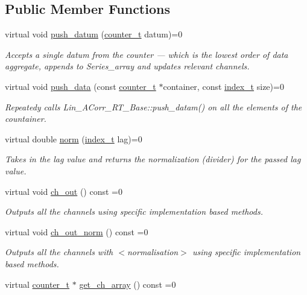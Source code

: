 \subsection*{Public Member Functions}
\begin{DoxyCompactItemize}
\item 
virtual void \hyperlink{classLin__ACorr__RT__Base_a398167525faf2a65f29722e943a0c57e}{push\+\_\+datum} (\hyperlink{types_8hpp_ac89ac912f524b3e3fa3720ea55fec966}{counter\+\_\+t} datum)=0
\begin{DoxyCompactList}\small\item\em Accepts a single {\ttfamily datum} from the counter — which is the lowest order of data aggregate, appends to Series\+\_\+array and updates relevant channels. \end{DoxyCompactList}\item 
virtual void \hyperlink{classLin__ACorr__RT__Base_a91c95a49619995f40aeae80916afed3e}{push\+\_\+data} (const \hyperlink{types_8hpp_ac89ac912f524b3e3fa3720ea55fec966}{counter\+\_\+t} $\ast$container, const \hyperlink{types_8hpp_a7c40bb931c31595ed6308605f4537447}{index\+\_\+t} size)=0
\begin{DoxyCompactList}\small\item\em Repeatedy calls {\ttfamily Lin\+\_\+\+A\+Corr\+\_\+\+R\+T\+\_\+\+Base\+::push\+\_\+datam()} on all the elements of the countainer. \end{DoxyCompactList}\item 
virtual double \hyperlink{classLin__ACorr__RT__Base_a06c0bbe593f87a9034aa34e95d9d46db}{norm} (\hyperlink{types_8hpp_a7c40bb931c31595ed6308605f4537447}{index\+\_\+t} lag)=0
\begin{DoxyCompactList}\small\item\em Takes in the lag value and returns the normalization (divider) for the passed lag value. \end{DoxyCompactList}\item 
virtual void \hyperlink{group__Lin__ACorr__Base__Out_ga4fe3bd7a6a98388d46827d22dc4596c9}{ch\+\_\+out} () const =0
\begin{DoxyCompactList}\small\item\em Outputs all the channels using specific implementation based methods. \end{DoxyCompactList}\item 
virtual void \hyperlink{group__Lin__ACorr__Base__Out_ga3e58cb03c3a93107758d506c53cf2461}{ch\+\_\+out\+\_\+norm} () const =0
\begin{DoxyCompactList}\small\item\em Outputs all the channels with {\bfseries } $<$normalisation$>$ using specific implementation based methods. \end{DoxyCompactList}\item 
virtual \hyperlink{types_8hpp_ac89ac912f524b3e3fa3720ea55fec966}{counter\+\_\+t} $\ast$ \hyperlink{group__Lin__ACorr__Base__Out_gafb6585805776a54d5e4f120cfd1fea9e}{get\+\_\+ch\+\_\+array} () const =0
\end{DoxyCompactItemize}


